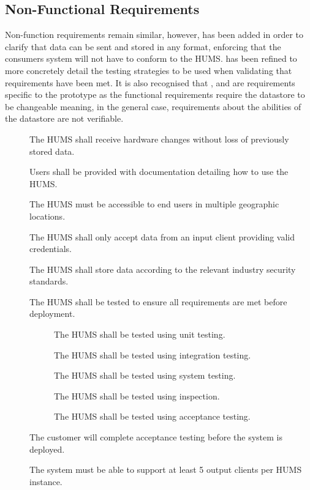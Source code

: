 \subsection{Non-Functional Requirements}
Non-function requirements remain similar, however,  has been added in order to clarify that data can be sent and stored in any format, enforcing that the consumers system will not have to conform to the HUMS. 
 has been refined to more concretely detail the testing strategies to be used when validating that requirements have been met.
It is also recognised that ,  and  are requirements specific to the prototype as the functional requirements require the datastore to be changeable meaning, in the general case, requirements about the abilities of the datastore are not verifiable.
\begin{description}
	\item[] The HUMS shall receive hardware changes without loss of 	previously stored data.
	\item[]  Users shall be provided with documentation detailing how 	to use the HUMS.
	\item[] The HUMS must be accessible to end users in multiple 		geographic locations.
	\item[]  The HUMS shall only accept data from an input client 		providing valid credentials. 
	\item[] The HUMS shall store data according to the relevant 		industry security standards. 
	\item[]  The HUMS shall be tested to ensure all requirements are 	met before deployment.
	\begin{description}
	\item[]  The HUMS shall be tested using unit testing.
	\item[]  The HUMS shall be tested using integration testing.
	\item[]  The HUMS shall be tested using system testing.
	\item[]  The HUMS shall be tested using inspection.
	\item[]  The HUMS shall be tested using acceptance testing.
	\end{description}
	\item[] The customer will complete acceptance testing before the 	system is deployed.
	\item[] The system must be able to support at least 5 output clients 	per HUMS instance. 

\end{description}
